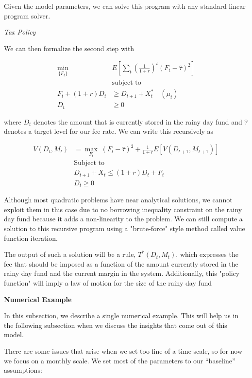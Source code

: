 Given the model parameters, we can solve this program with any standard linear program solver.

\textit{Tax Policy}

We can then formalize the second step with

\begin{align*}
  \min_{\{F_t\}} \; & E \left[ \sum_{t} \left( \frac{1}{1 + r} \right)^t (F_t - \hat{\tau})^2 \right] \\
  &\text{subject to} \\
  F_t + (1 + r) D_t &\geq D_{t+1} + X^*_t \quad (\mu_t) \\
  D_t &\geq 0
\end{align*}

where $D_t$ denotes the amount that is currently stored in the rainy day fund and $\hat{\tau}$
denotes a target level for our fee rate. We can write this recursively as

\begin{align*}
  V(D_t, M_t) &= \max_{F_t} \; (F_t - \hat{\tau})^2 + \frac{1}{1 + r} E [V(D_{t+1}, M_{t+1})] \\
  &\text{Subject to} \\
  &D_{t+1} + X_{t} \leq (1 + r) D_t + F_t \\
  &D_t \geq 0
\end{align*}

Although most quadratic problems have near analytical solutions, we cannot exploit them in this case
due to no borrowing inequality constraint on the rainy day fund because it adds a non-linearity to
the problem. We can still compute a solution to this recursive program using a "brute-force" style
method called value function iteration.

The output of such a solution will be a rule, $T^*(D_t, M_t)$, which expresses the fee that should
be imposed as a function of the amount currently stored in the rainy day fund and the current margin
in the system. Additionally, this "policy function" will imply a law of motion for the size of the
rainy day fund

\textbf{Numerical Example}

In this subsection, we describe a single numerical example. This will help us in the following
subsection when we discuss the insights that come out of this model.

There are some issues that arise when we set too fine of a time-scale, so for now we focus on a
monthly scale. We set most of the parameters to our ``baseline'' assumptions:

